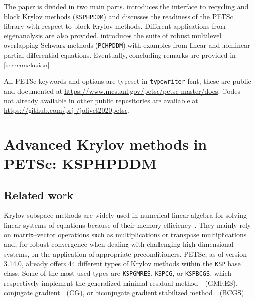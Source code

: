 \documentclass[3p,11pt]{elsarticle}
\newcommand{\pk}[1]{\texttt{#1}}
\begin{document}
The paper is divided in two main parts.  introduces
the interface to recycling and block Krylov methods
(\pk{KSPHPDDM}) and discusses the readiness of the PETSc library with respect to block Krylov methods.
Different applications from eigenanalysis are also provided.
 introduces the suite of robust multilevel overlapping Schwarz methods (\pk{PCHPDDM})
with examples from linear and nonlinear partial differential equations.
Eventually, concluding remarks are provided in \cref{sec:conclusion}.

All PETSc
keywords and options are typeset in \texttt{typewriter} font, these are
public and documented at \url{https://www.mcs.anl.gov/petsc/petsc-master/docs}.
Codes not already available in other public repositories are available at 
\url{https://github.com/prj-/jolivet2020petsc}.

\section{Advanced Krylov methods in PETSc: KSPHPDDM}\label{sec:KSPHPDDM}
  \subsection{Related work}
Krylov subspace methods are widely used in numerical linear algebra for solving
linear systems of equations because of their memory efficiency~\cite{barrett1994templates,saad2003iterative}.
They mainly rely on matrix--vector
operations such as multiplications or transpose multiplications and,
for robust convergence when dealing with challenging high-dimensional systems,
on the application of appropriate preconditioners.
PETSc, as of version 3.14.0, already offers 44 different types of
Krylov methods within the \pk{KSP} base class. Some of the
most used types are \pk{KSPGMRES}, \pk{KSPCG}, or \pk{KSPBCGS}, which respectively implement
the generalized minimal residual method~\cite{saad1986gmres}~(GMRES), conjugate
gradient~\cite{hestenes1952methods}~(CG), or biconjugate gradient stabilized method~\cite{van1992bi}~(BCGS). %
\end{document}

